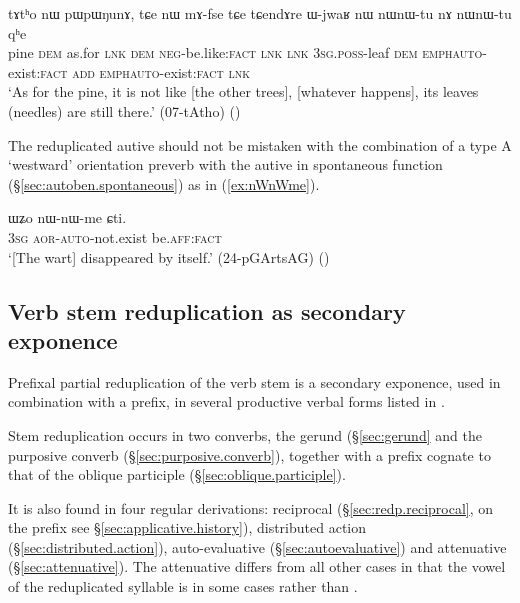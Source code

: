 \begin{exe}
\ex \label{ex:nWnWtu}
\gll tɤtʰo nɯ pɯpɯŋunɤ, tɕe nɯ mɤ-fse tɕe tɕendɤre ɯ-jwaʁ nɯ nɯ\redp{}nɯ-tu nɤ nɯ\redp{}nɯ-tu qʰe \\
pine \textsc{dem} as.for \textsc{lnk} \textsc{dem} \textsc{neg}-be.like:\textsc{fact} \textsc{lnk}  \textsc{lnk} \textsc{3sg}.\textsc{poss}-leaf \textsc{dem} \textsc{emph}\redp{}\textsc{auto}-exist:\textsc{fact} \textsc{add} \textsc{emph}\redp{}\textsc{auto}-exist:\textsc{fact} \textsc{lnk} \\
\glt `As for the pine, it is not like [the other trees], [whatever happens], its leaves (needles) are still there.'  (07-tAtho) ()
\end{exe}

The reduplicated autive should not be mistaken with the combination of a type A `westward' orientation preverb  with the autive in spontaneous function (§\ref{sec:autoben.spontaneous})  as in (\ref{ex:nWnWme}).

\begin{exe}
\ex \label{ex:nWnWme}
\gll ɯʑo nɯ-nɯ-me ɕti. \\
\textsc{3sg} \textsc{aor}-\textsc{auto}-not.exist be.\textsc{aff}:\textsc{fact} \\
\glt `[The wart] disappeared by itself.' (24-pGArtsAG) ()
\end{exe}
\subsection{Verb stem reduplication as secondary exponence} \label{sec:verb.stem.redp}
Prefixal partial reduplication of the verb stem is a secondary exponence, used in combination with a prefix, in several productive verbal forms listed in . 

Stem reduplication occurs in two converbs, the gerund (§\ref{sec:gerund} and the purposive converb (§\ref{sec:purposive.converb}), together with a  prefix cognate to that of the oblique participle (§\ref{sec:oblique.participle}).

It is also found in four regular derivations: reciprocal (§\ref{sec:redp.reciprocal}, on the  prefix see §\ref{sec:applicative.history}), distributed action (§\ref{sec:distributed.action}), auto-evaluative (§\ref{sec:autoevaluative}) and attenuative (§\ref{sec:attenuative}). The attenuative differs from all other cases in that the vowel of the reduplicated syllable is in some cases  rather than .

